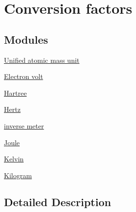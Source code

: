 \hypertarget{group___n_i_s_t_const-_conversion_factors}{}\section{Conversion factors}
\label{group___n_i_s_t_const-_conversion_factors}
\subsection*{Modules}
\begin{DoxyCompactItemize}
\item 
\hyperlink{group___n_i_s_t_const-_atomic_mass_unit}{Unified atomic mass unit}
\item 
\hyperlink{group___n_i_s_t_const-_electron_volt}{Electron volt}
\item 
\hyperlink{group___n_i_s_t_const-_hartree}{Hartree}
\item 
\hyperlink{group___n_i_s_t_const-_hertz}{Hertz}
\item 
\hyperlink{group___n_i_s_t_const-_inverse_meter}{inverse meter}
\item 
\hyperlink{group___n_i_s_t_const-_joule}{Joule}
\item 
\hyperlink{group___n_i_s_t_const-_kelvin}{Kelvin}
\item 
\hyperlink{group___n_i_s_t_const-_kilogram}{Kilogram}
\end{DoxyCompactItemize}


\subsection{Detailed Description}
